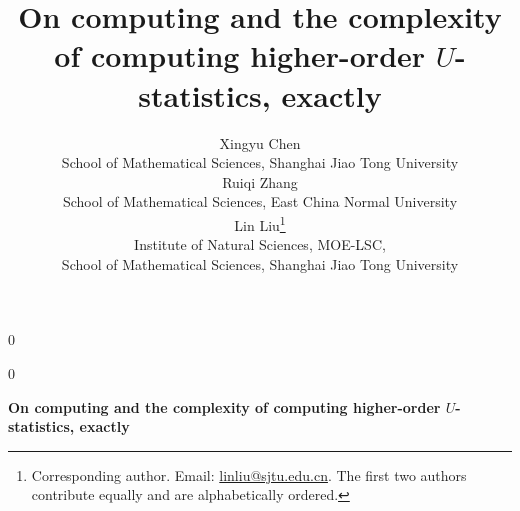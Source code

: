 \documentclass[12pt]{article}
\newcommand{\anon}{0}
\theoremstyle{plain}
\theoremstyle{definition}
\begin{document}
\def\spacingset#1{\renewcommand{\baselinestretch}%
{#1}\small\normalsize} \spacingset{1}




\anon
{
  \title{\bf On computing and the complexity of computing higher-order $U$-statistics, exactly}
  \author{Xingyu Chen \\
    School of Mathematical Sciences, Shanghai Jiao Tong University \\
    Ruiqi Zhang \\
    School of Mathematical Sciences, East China Normal University \\
    Lin Liu\thanks{Corresponding author. Email: \url{linliu@sjtu.edu.cn}. The first two authors contribute equally and are alphabetically ordered.}\hspace{.2cm} \\
    Institute of Natural Sciences, MOE-LSC, \\ 
    School of Mathematical Sciences, Shanghai Jiao Tong University}
  \maketitle
  \thispagestyle{empty}
} \fi

\anon
{
  \bigskip
  \bigskip
  \bigskip
  \begin{center}
    {\LARGE\bf On computing and the complexity of computing higher-order $U$-statistics, exactly}
\end{center}
  \medskip
} \fi
\end{document}
